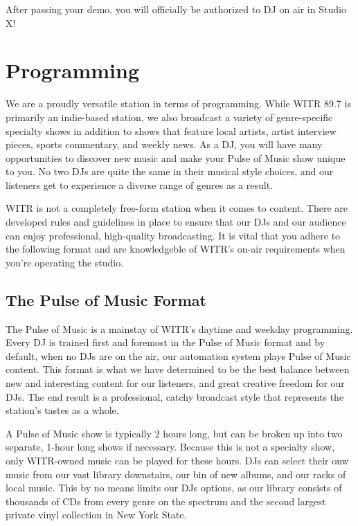 \documentclass{witrman}
\begin{document}
After passing your demo, you will officially be authorized to DJ on air in
Studio X\@!


\chapter{Programming}

We are a proudly versatile station in terms of programming.  While WITR 89.7 is
primarily an indie-based station, we also broadcast a variety of genre-specific
specialty shows in addition to shows that feature local artists, artist
interview pieces, sports commentary, and weekly news.  As a DJ, you will have
many opportunities to discover new music and make your Pulse of Music show
unique to you.  No two DJs are quite the same in their musical style choices,
and our listeners get to experience a diverse range of genres as a result.

WITR is not a completely free-form station when it comes to content.  There are
developed rules and guidelines in place to ensure that our DJs and our audience
can enjoy professional, high-quality broadcasting.  It is vital that you adhere
to the following format and are knowledgeble of WITR's on-air requirements when
you're operating the studio.

\section{The Pulse of Music Format}

The Pulse of Music is a mainstay of WITR's daytime and weekday programming.
Every DJ is trained first and foremost in the Pulse of Music format and by
default, when no DJs are on the air, our automation system plays Pulse of Music
content.  This format is what we have determined to be the best balance between
new and interesting content for our listeners, and great creative freedom for
our DJs.  The end result is a professional, catchy broadcast style that
represents the station's tastes as a whole.

A Pulse of Music show is typically 2 hours long, but can be broken up into two
separate, 1-hour long shows if necessary.  Because this is not a specialty show,
only WITR-owned music can be played for these hours.  DJs can select their onw
music from our vast library downstairs, our bin of new albums, and our racks of
local music.  This by no means limits our DJs options, as our library consists
of thousands of CDs from every genre on the spectrum and the second largest
private vinyl collection in New York State.
\end{document}
